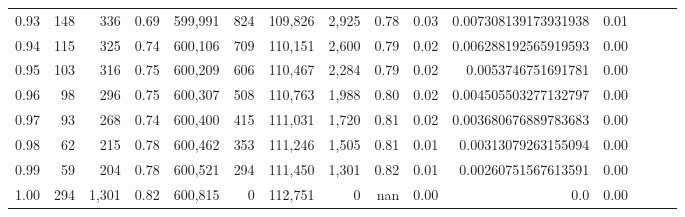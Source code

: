\begin{tabular}{rrrrrrrrrrrrrrr}
0.93 &     148 &    336 &  0.69 &  599,991 &      824 &  109,826 &    2,925 &  0.78 &  0.03 &  0.007308139173931938 &      0.01 \\
0.94 &     115 &    325 &  0.74 &  600,106 &      709 &  110,151 &    2,600 &  0.79 &  0.02 &  0.006288192565919593 &      0.00 \\
0.95 &     103 &    316 &  0.75 &  600,209 &      606 &  110,467 &    2,284 &  0.79 &  0.02 &    0.0053746751691781 &      0.00 \\
0.96 &      98 &    296 &  0.75 &  600,307 &      508 &  110,763 &    1,988 &  0.80 &  0.02 &  0.004505503277132797 &      0.00 \\
0.97 &      93 &    268 &  0.74 &  600,400 &      415 &  111,031 &    1,720 &  0.81 &  0.02 &  0.003680676889783683 &      0.00 \\
0.98 &      62 &    215 &  0.78 &  600,462 &      353 &  111,246 &    1,505 &  0.81 &  0.01 &   0.00313079263155094 &      0.00 \\
0.99 &      59 &    204 &  0.78 &  600,521 &      294 &  111,450 &    1,301 &  0.82 &  0.01 &   0.00260751567613591 &      0.00 \\
1.00 &     294 &  1,301 &  0.82 &  600,815 &        0 &  112,751 &        0 &   nan &  0.00 &                   0.0 &      0.00 \\
\bottomrule
\end{tabular}
